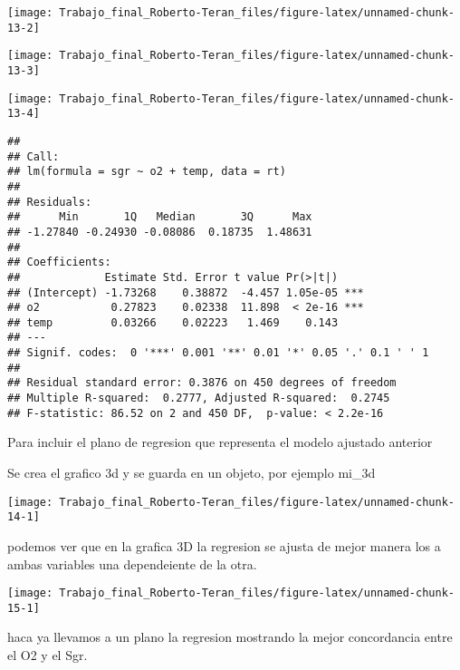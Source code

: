 \documentclass[
]{article}
\begin{document}
\begin{center}\texttt{[image: Trabajo\_final\_Roberto-Teran\_files/figure-latex/unnamed-chunk-13-2]} \end{center}

\begin{center}\texttt{[image: Trabajo\_final\_Roberto-Teran\_files/figure-latex/unnamed-chunk-13-3]} \end{center}

\begin{center}\texttt{[image: Trabajo\_final\_Roberto-Teran\_files/figure-latex/unnamed-chunk-13-4]} \end{center}

\begin{verbatim}
## 
## Call:
## lm(formula = sgr ~ o2 + temp, data = rt)
## 
## Residuals:
##      Min       1Q   Median       3Q      Max 
## -1.27840 -0.24930 -0.08086  0.18735  1.48631 
## 
## Coefficients:
##             Estimate Std. Error t value Pr(>|t|)    
## (Intercept) -1.73268    0.38872  -4.457 1.05e-05 ***
## o2           0.27823    0.02338  11.898  < 2e-16 ***
## temp         0.03266    0.02223   1.469    0.143    
## ---
## Signif. codes:  0 '***' 0.001 '**' 0.01 '*' 0.05 '.' 0.1 ' ' 1
## 
## Residual standard error: 0.3876 on 450 degrees of freedom
## Multiple R-squared:  0.2777, Adjusted R-squared:  0.2745 
## F-statistic: 86.52 on 2 and 450 DF,  p-value: < 2.2e-16
\end{verbatim}

Para incluir el plano de regresion que representa el modelo ajustado
anterior

Se crea el grafico 3d y se guarda en un objeto, por ejemplo mi\_3d

\begin{center}\texttt{[image: Trabajo\_final\_Roberto-Teran\_files/figure-latex/unnamed-chunk-14-1]} \end{center}

podemos ver que en la grafica 3D la regresion se ajusta de mejor manera
los a ambas variables una dependeiente de la otra.

\begin{center}\texttt{[image: Trabajo\_final\_Roberto-Teran\_files/figure-latex/unnamed-chunk-15-1]} \end{center}

haca ya llevamos a un plano la regresion mostrando la mejor concordancia
entre el O2 y el Sgr.
\end{document}

